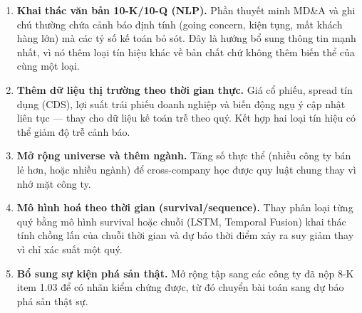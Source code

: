 \documentclass[13pt,a4paper]{extreport}
\begin{document}
\begin{enumerate}
\item \textbf{Khai thác văn bản 10-K/10-Q (NLP).} Phần thuyết minh MD\&A và ghi chú thường chứa cảnh báo định tính (going concern, kiện tụng, mất khách hàng lớn) mà các tỷ số kế toán bỏ sót. Đây là hướng bổ sung thông tin mạnh nhất, vì nó thêm loại tín hiệu khác về bản chất chứ không thêm biến thể của cùng một loại.
\item \textbf{Thêm dữ liệu thị trường theo thời gian thực.} Giá cổ phiếu, spread tín dụng (CDS), lợi suất trái phiếu doanh nghiệp và biến động ngụ ý cập nhật liên tục — thay cho dữ liệu kế toán trễ theo quý. Kết hợp hai loại tín hiệu có thể giảm độ trễ cảnh báo.
\item \textbf{Mở rộng universe và thêm ngành.} Tăng số thực thể (nhiều công ty bán lẻ hơn, hoặc nhiều ngành) để cross-company học được quy luật chung thay vì nhớ mặt công ty.
\item \textbf{Mô hình hoá theo thời gian (survival/sequence).} Thay phân loại từng quý bằng mô hình survival hoặc chuỗi (LSTM, Temporal Fusion) khai thác tính chồng lấn của chuỗi thời gian và dự báo thời điểm xảy ra suy giảm thay vì chỉ xác suất một quý.
\item \textbf{Bổ sung sự kiện phá sản thật.} Mở rộng tập sang các công ty đã nộp 8-K item 1.03 để có nhãn kiểm chứng được, từ đó chuyển bài toán sang dự báo phá sản thật sự.
\end{enumerate}

\clearpage
\end{document}
